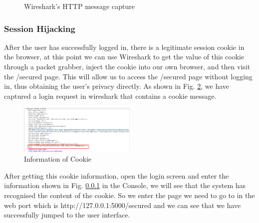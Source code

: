 \documentclass{article}
\begin{document}
\begin{figure}[htb]
    \caption{Wireshark's HTTP message capture}
    \label{fig:Demo Registration}
\end{figure}

\subsubsection{Session Hijacking}
After the user has successfully logged in, there is a legitimate session cookie in the browser, at this point we can use Wireshark to get the value of this cookie through a packet grabber, inject the cookie into our own browser, and then visit the /secured page. This will allow us to access the /secured page without logging in, thus obtaining the user's privacy directly. 
As shown in Fig. \ref{fig:cookie}, we have captured a login request in wireshark that contains a cookie message.

\begin{figure}[htb]
    \centering
    \includegraphics[width=0.5\textwidth]{images/Information of Cookie.png}
    \caption{Information of Cookie}
    \label{fig:cookie}
\end{figure}

After getting this cookie information, open the login screen and enter the information shown in Fig. \ref{} in the Console, we will see that the system has recognised the content of the cookie. 
So we enter the page we need to go to in the web port which is http://127.0.0.1:5000/secured and we can see that we have successfully jumped to the user interface.

    
\end{document}

